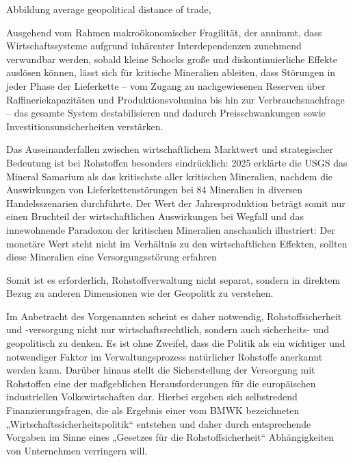 \documentclass[12pt,a4paper,oneside]{book} %
\begin{document}
	Abbildung average geopolitical distance of trade, 
	
	Ausgehend vom Rahmen makroökonomischer Fragilität, der annimmt, dass Wirtschaftssysteme aufgrund inhärenter Interdependenzen zunehmend verwundbar werden, sobald kleine Schocks große und diskontinuierliche Effekte auslösen können, lässt sich für kritische Mineralien ableiten, dass Störungen in jeder Phase der Lieferkette – vom Zugang zu nachgewiesenen Reserven über Raffineriekapazitäten und Produktionsvolumina bis hin zur Verbrauchsnachfrage – das gesamte System destabilisieren und dadurch Preisschwankungen sowie Investitionsunsicherheiten verstärken.\autocite{https://mpra.ub.uni-muenchen.de/125317/1/MPRA_paper_125317.pdf}
	
	Das Auseinanderfallen zwischen wirtschaftlichem Marktwert und strategischer Bedeutung ist bei Rohstoffen besonders eindrücklich: 2025 erklärte die USGS das Mineral Samarium als das kritischste aller kritischen Mineralien, nachdem die Auswirkungen von Lieferkettenstörungen bei 84 Mineralien in diversen Handelsszenarien durchführte.\autocite{NEEDED}
	Der Wert der Jahresproduktion beträgt somit nur einen Bruchteil der wirtschaftlichen Auswirkungen bei Wegfall und das innewohnende Paradoxon der kritischen Mineralien anschaulich illustriert: Der monetäre Wert steht nicht im Verhältnis zu den wirtschaftlichen Effekten, sollten diese Mineralien eine Versorgungsstörung erfahren
	
	Somit ist es erforderlich, Rohstoffverwaltung nicht separat, sondern in direktem Bezug zu anderen Dimensionen wie der Geopolitk zu verstehen.
	
	Im Anbetracht des Vorgenannten scheint es daher notwendig, Rohstoffsicherheit und -versorgung nicht nur wirtschaftsrechtlich, sondern auch sicherheits- und geopolitisch zu denken. Es ist ohne Zweifel, dass die Politik als ein wichtiger und notwendiger Faktor im Verwaltungsprozess natürlicher Rohstoffe anerkannt werden kann.\autocite[hierzu ausführlich][239-248]{henning_politics_1968} Darüber hinaus stellt die Sicherstellung der Versorgung mit Rohstoffen eine der maßgeblichen Herausforderungen für die europäischen industriellen Volkswirtschaften dar.\autocite{europaische_kommission_study_2023} Hierbei ergeben sich selbstredend Finanzierungsfragen, die als Ergebnis einer vom BMWK bezeichneten „Wirtschaftssicherheitspolitik“ entstehen und daher durch entsprechende Vorgaben im Sinne eines „Gesetzes für die Rohstoffsicherheit“ Abhängigkeiten von Unternehmen verringern will.\autocite{lohr_gesetz_2022}
	
\end{document}
